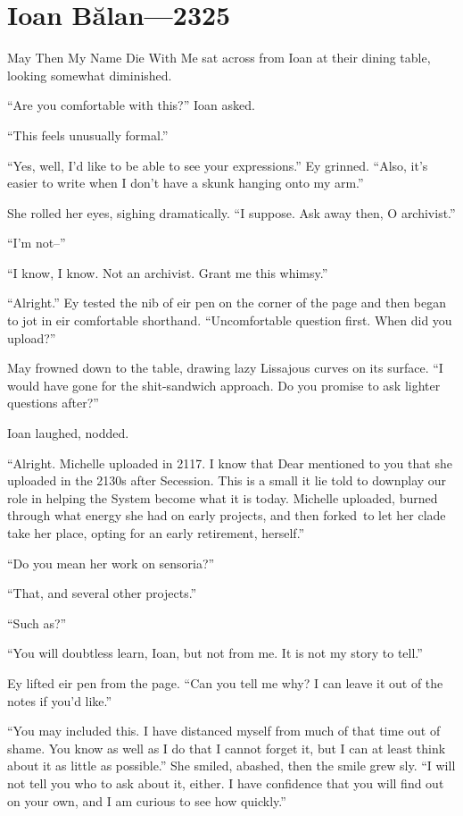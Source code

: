 \hypertarget{ioan-bux103lan-2325}{%
\chapter{Ioan Bălan---2325}\label{ioan-bux103lan-2325}}

May Then My Name Die With Me sat across from Ioan at their dining table, looking somewhat diminished.

``Are you comfortable with this?'' Ioan asked.

``This feels unusually formal.''

``Yes, well, I'd like to be able to see your expressions.'' Ey grinned. ``Also, it's easier to write when I don't have a skunk hanging onto my arm.''

She rolled her eyes, sighing dramatically. ``I suppose. Ask away then, O archivist.''

``I'm not--''

``I know, I know. Not an archivist. Grant me this whimsy.''

``Alright.'' Ey tested the nib of eir pen on the corner of the page and then began to jot in eir comfortable shorthand. ``Uncomfortable question first. When did you upload?''

May frowned down to the table, drawing lazy Lissajous curves on its surface. ``I would have gone for the shit-sandwich approach. Do you promise to ask lighter questions after?''

Ioan laughed, nodded.

``Alright. Michelle uploaded in 2117. I know that Dear mentioned to you that she uploaded in the 2130s after Secession. This is a small it lie told to downplay our role in helping the System become what it is today. Michelle uploaded, burned through what energy she had on early projects, and then forked\pagebreak\ to let her clade take her place, opting for an early retirement, herself.''

``Do you mean her work on sensoria?''

``That, and several other projects.''

``Such as?''

``You will doubtless learn, Ioan, but not from me. It is not my story to tell.''

Ey lifted eir pen from the page. ``Can you tell me why? I can leave it out of the notes if you'd like.''

``You may included this. I have distanced myself from much of that time out of shame. You know as well as I do that I cannot forget it, but I can at least think about it as little as possible.'' She smiled, abashed, then the smile grew sly. ``I will not tell you who to ask about it, either. I have confidence that you will find out on your own, and I am curious to see how quickly.''

